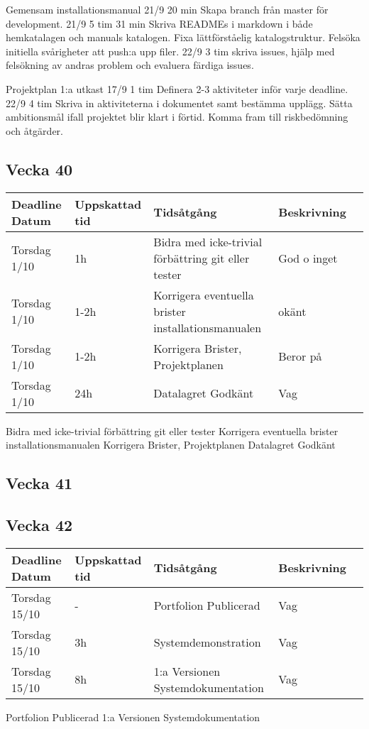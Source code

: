 \documentclass{TDP003mall}
\begin{document}
Gemensam installationsmanual
21/9 20 min Skapa branch från master för development.
21/9 5 tim 31 min Skriva READMEs i markdown i både hemkatalagen och manuals katalogen. Fixa lättförståelig katalogstruktur. Felsöka initiella svårigheter att push:a upp filer.
22/9 3 tim skriva issues, hjälp med felsökning av andras problem och evaluera färdiga issues.

Projektplan 1:a utkast
17/9 1 tim Definera 2-3 aktiviteter inför varje deadline.
22/9 4 tim Skriva in aktiviteterna i dokumentet samt bestämma upplägg.
Sätta ambitionsmål ifall projektet blir klart i förtid.
Komma fram till riskbedömning och åtgärder.

\subsection{Vecka 40}
\begin{tabular}{|l|l|l|l|l|}
  \hline
  Deadline Datum & Uppskattad tid & Tidsåtgång & Beskrivning\\ [0.5ex]
  \hline
  Torsdag 1/10 & 1h & Bidra med icke-trivial förbättring git eller tester & God o inget\\
  \hline
  Torsdag 1/10 & 1-2h & Korrigera eventuella brister installationsmanualen & okänt\\
  \hline
  Torsdag 1/10 & 1-2h & Korrigera Brister, Projektplanen & Beror på\\
  \hline
  Torsdag 1/10 & 24h & Datalagret Godkänt & Vag\\
  \hline
\end{tabular}
Bidra med icke-trivial förbättring git eller tester
Korrigera eventuella brister installationsmanualen
Korrigera Brister, Projektplanen
Datalagret Godkänt

\subsection{Vecka 41}


\subsection{Vecka 42}
\begin{tabular}{|l|l|l|l|l|}
  \hline
  Deadline Datum & Uppskattad tid & Tidsåtgång & Beskrivning\\ [0.5ex]
  \hline
  Torsdag 15/10 & - & Portfolion Publicerad & Vag\\
  \hline
  Torsdag 15/10 & 3h & Systemdemonstration & Vag\\
  \hline
  Torsdag 15/10 & 8h & 1:a Versionen Systemdokumentation & Vag\\
  \hline
\end{tabular}
Portfolion Publicerad
1:a Versionen Systemdokumentation
\end{document}
